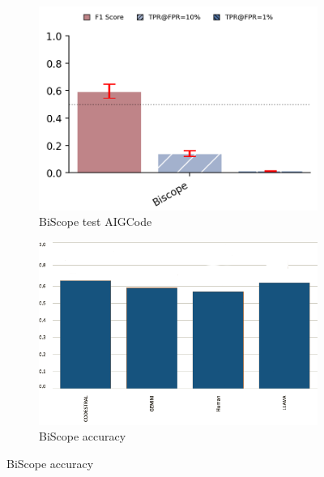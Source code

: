 \begin{figure}[H]
    \begin{subfigure}[t]{0.4\textwidth}
        \centering
        \includegraphics[width=\linewidth]{img/TEST/Biscope/Uncovering-AIG.png}
        \caption{BiScope test AIGCode}
        \label{fig:c1}
    \end{subfigure}
    \hfill
    \begin{subfigure}[b]{0.4\textwidth}
        \centering
        \includegraphics[width=\linewidth]{img/TEST/BiScope/visualization(36).png}
        \caption{BiScope accuracy}
        \label{fig:cc3}
    \end{subfigure}
\end{figure}



